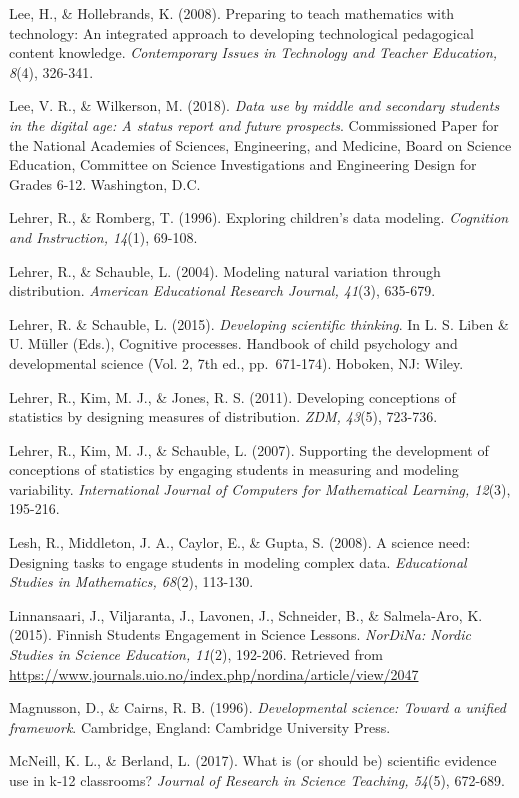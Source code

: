 \documentclass[]{book}
\theoremstyle{definition}
\theoremstyle{definition}
\theoremstyle{definition}
\theoremstyle{remark}
\begin{document}
Lee, H., \& Hollebrands, K. (2008). Preparing to teach mathematics with
technology: An integrated approach to developing technological
pedagogical content knowledge. \emph{Contemporary Issues in Technology
and Teacher Education, 8}(4), 326-341.

Lee, V. R., \& Wilkerson, M. (2018). \emph{Data use by middle and
secondary students in the digital age: A status report and future
prospects}. Commissioned Paper for the National Academies of Sciences,
Engineering, and Medicine, Board on Science Education, Committee on
Science Investigations and Engineering Design for Grades 6-12.
Washington, D.C.

Lehrer, R., \& Romberg, T. (1996). Exploring children's data modeling.
\emph{Cognition and Instruction, 14}(1), 69-108.

Lehrer, R., \& Schauble, L. (2004). Modeling natural variation through
distribution. \emph{American Educational Research Journal, 41}(3),
635-679.

Lehrer, R. \& Schauble, L. (2015). \emph{Developing scientific
thinking}. In L. S. Liben \& U. Müller (Eds.), Cognitive processes.
Handbook of child psychology and developmental science (Vol. 2, 7th ed.,
pp.~671-174). Hoboken, NJ: Wiley.

Lehrer, R., Kim, M. J., \& Jones, R. S. (2011). Developing conceptions
of statistics by designing measures of distribution. \emph{ZDM, 43}(5),
723-736.

Lehrer, R., Kim, M. J., \& Schauble, L. (2007). Supporting the
development of conceptions of statistics by engaging students in
measuring and modeling variability. \emph{International Journal of
Computers for Mathematical Learning, 12}(3), 195-216.

Lesh, R., Middleton, J. A., Caylor, E., \& Gupta, S. (2008). A science
need: Designing tasks to engage students in modeling complex data.
\emph{Educational Studies in Mathematics, 68}(2), 113-130.

Linnansaari, J., Viljaranta, J., Lavonen, J., Schneider, B., \&
Salmela-Aro, K. (2015). Finnish Students Engagement in Science Lessons.
\emph{NorDiNa: Nordic Studies in Science Education, 11}(2), 192-206.
Retrieved from
\url{https://www.journals.uio.no/index.php/nordina/article/view/2047}

Magnusson, D., \& Cairns, R. B. (1996). \emph{Developmental science:
Toward a unified framework}. Cambridge, England: Cambridge University
Press.

McNeill, K. L., \& Berland, L. (2017). What is (or should be) scientific
evidence use in k‐12 classrooms? \emph{Journal of Research in Science
Teaching, 54}(5), 672-689.
\end{document}
